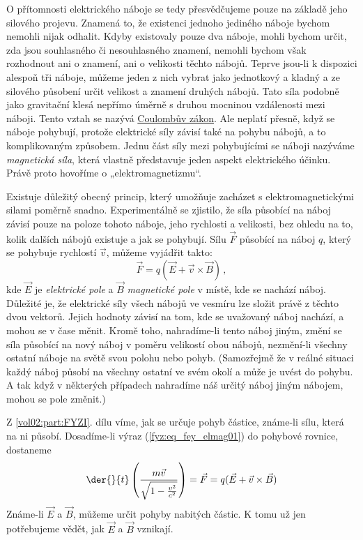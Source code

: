     O přítomnosti elektrického náboje se tedy přesvědčujeme pouze na základě jeho silového projevu.
    Znamená to, že existenci jednoho jediného náboje bychom nemohli nijak odhalit. Kdyby
    existovaly pouze dva náboje, mohli bychom určit, zda jsou souhlasného či nesouhlasného
    znamení, nemohli bychom však rozhodnout ani o znamení, ani o velikosti těchto nábojů. Teprve
    jsou-li k dispozici alespoň tři náboje, můžeme jeden z nich vybrat jako jednotkový a kladný a
    ze silového působení určit velikost a znamení druhých nábojů. Tato síla podobně jako gravitační 
    klesá nepřímo úměrně s druhou mocninou vzdálenosti mezi náboji. Tento vztah se nazývá 
    \hyperlink{fyz:IIchapIVsecII}{Coulombův zákon}. Ale neplatí přesně, když se náboje pohybují, 
    protože elektrické síly závisí také na pohybu nábojů, a to komplikovaným způsobem. Jednu část 
    síly mezi pohybujícími se náboji nazýváme \emph{magnetická síla}, která vlastně představuje 
    jeden aspekt elektrického účinku. Právě proto hovoříme o „elektromagnetizmu“.
    
    Existuje důležitý obecný princip, který umožňuje zacházet s elektromagnetickými silami poměrně 
    snadno. Experimentálně se zjistilo, že síla působící na náboj závisí pouze na poloze tohoto 
    náboje, jeho rychlosti a velikosti, bez ohledu na to, kolik dalších nábojů existuje a jak se 
    pohybují. Sílu \(\vec{F}\) působící na náboj \(q\), který se pohybuje rychlostí \(\vec{v}\), 
    můžeme vyjádřit takto:
    \begin{equation}\label{fyz:eq_fey_elmag01}
      \boxed{\vec{F} = q(\vec{E}+\vec{v}\times\vec{B})}\, ,
    \end{equation}
    kde \(\vec{E}\) je \emph{elektrické pole} a \(\vec{B}\) \emph{magnetické pole} v místě, kde se 
    nachází náboj. Důležité je, že elektrické síly všech nábojů ve vesmíru lze složit právě z 
    těchto dvou vektorů. Jejich hodnoty závisí na tom, kde se uvažovaný náboj nachází, a mohou se v 
    čase měnit. Kromě toho, nahradíme-li tento náboj jiným, změní se síla působící na nový náboj v 
    poměru velikostí obou nábojů, nezmění-li všechny ostatní náboje na světě svou polohu nebo 
    pohyb. (Samozřejmě že v reálné situaci každý náboj působí na všechny ostatní ve svém okolí a 
    může je uvést do pohybu. A tak když v některých případech nahradíme náš určitý náboj jiným 
    nábojem, mohou se pole změnit.)
    
    Z \ref{vol02:part:FYZI}. dílu víme, jak se určuje pohyb částice, známe-li sílu, která na ni působí. 
    Dosadíme-li výraz (\ref{fyz:eq_fey_elmag01}) do pohybové rovnice, dostaneme
    \begin{equation}\label{fyz:eq_fey_elmag02}
      \der{ }{t}\left(\frac{m\vec{v}}{\sqrt{1-\frac{v^2}{c^2}}}\right) = \vec{F} =
      q(\vec{E}+\vec{v}\times\vec{B})
    \end{equation}
    Známe-li \(\vec{E}\) a \(\vec{B}\), můžeme určit pohyby nabitých částic. K tomu už jen 
    potřebujeme vědět, jak \(\vec{E}\) a \(\vec{B}\) vznikají.
    
